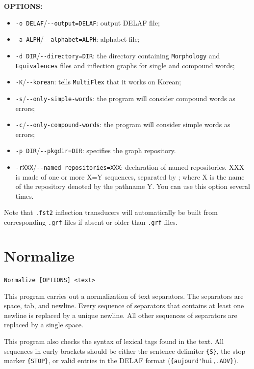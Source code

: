 \bigskip
\noindent \textbf{OPTIONS:}
\begin{itemize}
  \item \verb+-o DELAF+/\verb+--output=DELAF+: output DELAF file;
  \item \verb+-a ALPH+/\verb+--alphabet=ALPH+: alphabet file;
  \item \verb+-d DIR+/\verb+--directory=DIR+: the directory containing
  \verb+Morphology+ and \verb+Equivalences+ files and inflection graphs for
                                              single and compound words;
  \item \verb+-K+/\verb+--korean+: tells \verb+MultiFlex+ that it works on
  Korean;
  \item \verb+-s+/\verb+--only-simple-words+: the program will consider
  compound words as errors;
  \item \verb+-c+/\verb+--only-compound-words+: the program will consider
  simple words as errors;
  \item \verb+-p DIR+/\verb+--pkgdir=DIR+: specifies the graph repository.
  \item \verb+-rXXX+/\verb+--named_repositories=XXX+: declaration of named
  repositories. XXX is made of one or more X=Y sequences, separated by ; 
  where X is the name of the repository denoted by the pathname Y. You 
  can use this option several times.
  
\end{itemize}

\bigskip
\noindent Note that \verb+.fst2+ inflection transducers will automatically be
built from corresponding \verb+.grf+ files if absent or older than \verb+.grf+
files.







\section{Normalize}
\verb+Normalize [OPTIONS] <text>+

\bigskip
\noindent {}This 
program carries out a normalization of text separators. The separators are
space, tab, and newline. Every sequence of separators that contains at least one
newline is replaced by a unique newline. All other sequences of separators are
replaced by a single space.

\bigskip
\noindent This program also checks the syntax of lexical tags found in the text. All
sequences in curly brackets should be either the sentence delimiter \verb+{S}+,
the stop marker \verb+{STOP}+, or valid entries in the DELAF format (\verb+{aujourd'hui,.ADV}+). 

